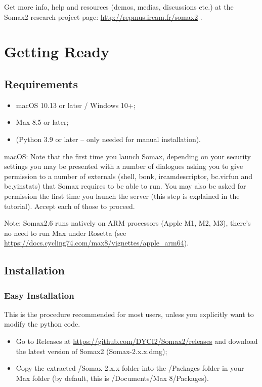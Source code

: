 Get more info, help and resources (demos, medias, discussions etc.) at the Somax2 research project page: \url{http://repmus.ircam.fr/somax2} .

\section{Getting Ready}

\subsection{Requirements}

\begin{itemize}
    \item macOS 10.13 or later / Windows 10+;
    \item Max 8.5 or later;
    \item (Python 3.9 or later -- only needed for manual installation).
\end{itemize}

macOS: Note that the first time you launch Somax, depending on your security settings you may be presented with a number of dialogues asking you to give permission to a number of externals (shell, bonk, ircamdescriptor, bc.virfun and bc.yinstats) that Somax requires to be able to run. You may also be asked for permission the first time you launch the server (this step is explained in the tutorial). Accept each of those to proceed.

Note: Somax2.6 runs natively on ARM processors (Apple M1, M2, M3), there's no need to run Max under Rosetta (see \url{https://docs.cycling74.com/max8/vignettes/apple_arm64}).

\subsection{Installation}

\subsubsection{Easy Installation}

This is the procedure recommended for most users, unless you explicitly want to modify the python code.

\begin{itemize}
    \item Go to Releases at \url{https://github.com/DYCI2/Somax2/releases} and download the latest version of Somax2 (Somax-2.x.x.dmg);
    \item Copy the extracted /Somax-2.x.x folder  into the /Packages folder in your Max folder (by default, this is /Documents/Max 8/Packages).
\end{itemize}


